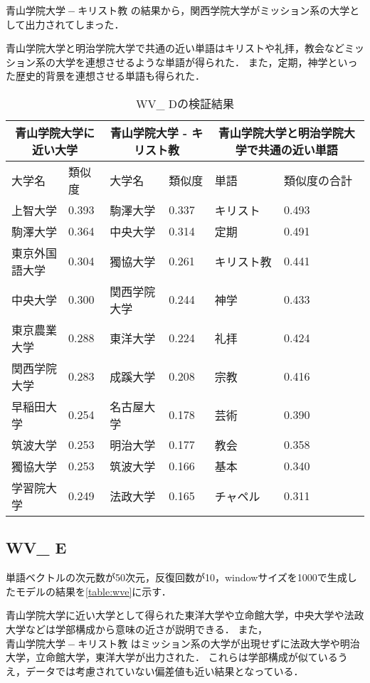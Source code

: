$ 青山学院大学 - キリスト教 $ の結果から，関西学院大学がミッション系の大学として出力されてしまった．

青山学院大学と明治学院大学で共通の近い単語はキリストや礼拝，教会などミッション系の大学を連想させるような単語が得られた．
また，定期，神学といった歴史的背景を連想させる単語も得られた．


\begin{table}[H]
\caption{WV\_ Dの検証結果}
\centering
\footnotesize
\begin{tabular}{ll|ll|ll}
\hline
\multicolumn{2}{c}{青山学院大学に近い大学} & \multicolumn{2}{c}{青山学院大学 - キリスト教} & \multicolumn{2}{c}{青山学院大学と明治学院大学で共通の近い単語}
\\ \hline
大学名 & 類似度 & 大学名 & 類似度 & 単語 & 類似度の合計
\\ \hline \hline
上智大学 & 0.393 & 駒澤大学 & 0.337 & キリスト & 0.493\\
駒澤大学 & 0.364 & 中央大学 & 0.314 & 定期 & 0.491\\
東京外国語大学 & 0.304 & 獨協大学 & 0.261 & キリスト教 & 0.441\\
中央大学 & 0.300 & 関西学院大学 & 0.244 & 神学 & 0.433\\
東京農業大学 & 0.288 & 東洋大学 & 0.224 & 礼拝 & 0.424\\
関西学院大学 & 0.283 & 成蹊大学 & 0.208 & 宗教 & 0.416\\
早稲田大学 & 0.254 & 名古屋大学 & 0.178 & 芸術 & 0.390\\
筑波大学 & 0.253 & 明治大学 & 0.177 & 教会 & 0.358\\
獨協大学 & 0.253 & 筑波大学 & 0.166 & 基本 & 0.340\\
学習院大学 & 0.249 & 法政大学 & 0.165 & チャペル & 0.311\\ \hline
\end{tabular}
\label{table:wvd}
\end{table}

\subsection{WV\_ E}
単語ベクトルの次元数が50次元，反復回数が10，windowサイズを1000で生成したモデルの結果を\ref{table:wve}に示す．

青山学院大学に近い大学として得られた東洋大学や立命館大学，中央大学や法政大学などは学部構成から意味の近さが説明できる．
また，$ 青山学院大学 - キリスト教 $ はミッション系の大学が出現せずに法政大学や明治大学，立命館大学，東洋大学が出力された．
これらは学部構成が似ているうえ，データでは考慮されていない偏差値も近い結果となっている．

